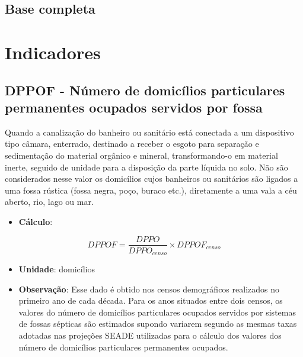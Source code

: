 \documentclass[]{book}
\providecommand{\tightlist}{%
  \setlength{\itemsep}{0pt}\setlength{\parskip}{0pt}}
\begin{document}
\hypertarget{base-completa}{%
\section{Base completa}\label{base-completa}}

\hypertarget{indicadores}{%
\chapter{Indicadores}\label{indicadores}}

\hypertarget{dppof---nuxfamero-de-domicuxedlios-particulares-permanentes-ocupados-servidos-por-fossa}{%
\section*{DPPOF - Número de domicílios particulares permanentes ocupados servidos por fossa}\label{dppof---nuxfamero-de-domicuxedlios-particulares-permanentes-ocupados-servidos-por-fossa}}

Quando a canalização do banheiro ou sanitário está conectada a um dispositivo tipo câmara, enterrado, destinado a receber o esgoto para separação e sedimentação do material orgânico e mineral, transformando-o em material inerte, seguido de unidade para a disposição da parte líquida no solo. Não são considerados nesse valor os domicílios cujos banheiros ou sanitários são ligados a uma fossa rústica (fossa negra, poço, buraco etc.), diretamente a uma vala a céu aberto, rio, lago ou mar.

\begin{itemize}
\tightlist
\item
  \textbf{Cálculo}:
\end{itemize}

\[
DPPOF = \frac{DPPO}{DPPO_{censo}} \times DPPOF_{censo}
\]

\begin{itemize}
\item
  \textbf{Unidade}: domicílios
\item
  \textbf{Observação}: Esse dado é obtido nos censos demográficos realizados no primeiro ano de cada década. Para os anos situados entre dois censos, os valores do número de domicílios particulares ocupados servidos por sistemas de fossas sépticas são estimados supondo variarem segundo as mesmas taxas adotadas nas projeções SEADE utilizadas para o cálculo dos valores dos número de domicílios particulares permanentes ocupados.
\end{itemize}
\end{document}
